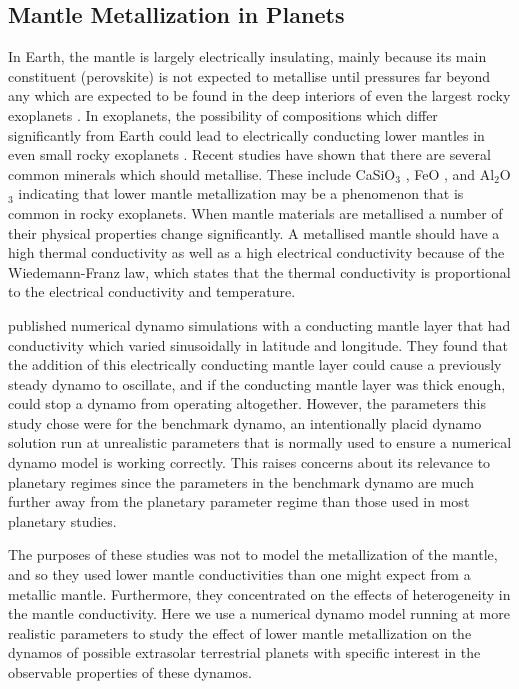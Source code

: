 \subsection{Mantle Metallization in Planets}
In Earth, the mantle is largely electrically insulating, mainly because its main constituent (perovskite) is not expected to metallise until pressures far beyond any which are expected to be found in the deep interiors of even the largest rocky exoplanets \citep{tsuchiya2011}. In exoplanets, the possibility of compositions which differ significantly from Earth could lead to electrically conducting lower mantles in even small rocky exoplanets \citep{ohta2012}. Recent studies have shown that there are several common minerals which should metallise. These include CaSiO$_{3}$ \citep{tsuchiya2011}, FeO \citep{ohta2012}, and Al$_{2}$O$_{3}$ \citep{nellis2010} indicating that lower mantle metallization may be a phenomenon that is common in rocky exoplanets. When mantle materials are metallised a number of their physical properties change significantly. A metallised mantle should have a high thermal conductivity as well as a high electrical conductivity because of the Wiedemann-Franz law, which states that the thermal conductivity is proportional to the electrical conductivity and temperature.

\citet{chan2008} published numerical dynamo simulations with a conducting mantle layer that had  conductivity which varied sinusoidally in latitude and longitude. They found that the addition of this electrically conducting mantle layer could cause a previously steady dynamo to oscillate, and if the conducting mantle layer was thick enough, could stop a dynamo from operating altogether. However, the parameters this study chose were for the benchmark dynamo, an intentionally placid dynamo solution run at unrealistic parameters that is normally used to ensure a numerical dynamo model is working correctly. This raises concerns about its relevance to planetary regimes since the parameters in the benchmark dynamo are much further away from the planetary parameter regime than those used in most planetary studies.

The purposes of these studies was not to model the metallization of the mantle, and so they used lower mantle conductivities than one might expect from a metallic mantle. Furthermore, they concentrated on the effects of heterogeneity in the mantle conductivity. Here we use a numerical dynamo model running at more realistic parameters to study the effect of lower mantle metallization on the dynamos of possible extrasolar terrestrial planets with specific interest in the observable properties of these dynamos.

